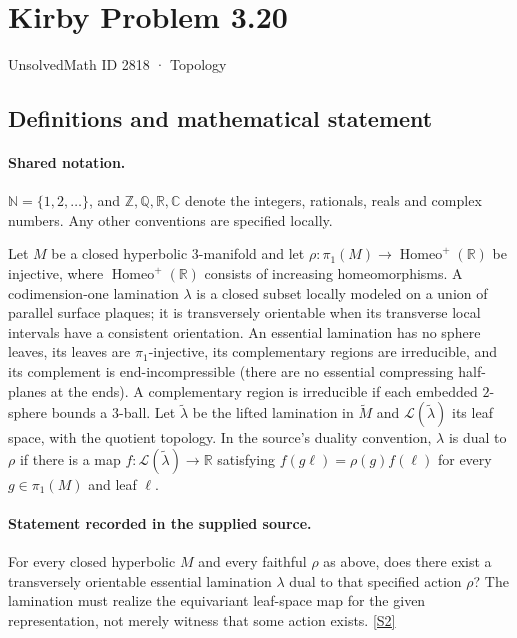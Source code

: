 \documentclass[11pt]{article}
\newcommand{\sref}[2]{\hyperlink{source:#1:#2}{[S#2]}}
\begin{document}
\setcounter{section}{2817}
\section{Kirby Problem 3.20}\label{2818}
{\small\sffamily UnsolvedMath ID 2818 · Topology}
\subsection{Definitions and mathematical statement}

\paragraph{Shared notation.}$\mathbb N=\{1,2,\ldots\}$, and $\mathbb Z,\mathbb Q,\mathbb R,\mathbb C$ denote the integers, rationals, reals and complex numbers. Any other conventions are specified locally.


Let $M$ be a closed hyperbolic $3$-manifold and let $\rho:\pi_1(M)\to\operatorname{Homeo}^+(\mathbb R)$ be injective, where $\operatorname{Homeo}^+(\mathbb R)$ consists of increasing homeomorphisms. A codimension-one lamination $\lambda$ is a closed subset locally modeled on a union of parallel surface plaques; it is transversely orientable when its transverse local intervals have a consistent orientation. An essential lamination has no sphere leaves, its leaves are $\pi_1$-injective, its complementary regions are irreducible, and its complement is end-incompressible (there are no essential compressing half-planes at the ends). A complementary region is irreducible if each embedded $2$-sphere bounds a $3$-ball.
Let $\widetilde\lambda$ be the lifted lamination in $\widetilde M$ and $\mathcal L(\widetilde\lambda)$ its leaf space, with the quotient topology. In the source's duality convention, $\lambda$ is dual to $\rho$ if there is a map $f:\mathcal L(\widetilde\lambda)\to\mathbb R$ satisfying $f(g\ell)=\rho(g)f(\ell)$ for every $g\in\pi_1(M)$ and leaf $\ell$.
\paragraph{Statement recorded in the supplied source.}
For every closed hyperbolic $M$ and every faithful $\rho$ as above, does there exist a transversely orientable essential lamination $\lambda$ dual to that specified action $\rho$? The lamination must realize the equivariant leaf-space map for the given representation, not merely witness that some action exists. \sref{2818}{2}
\end{document}
